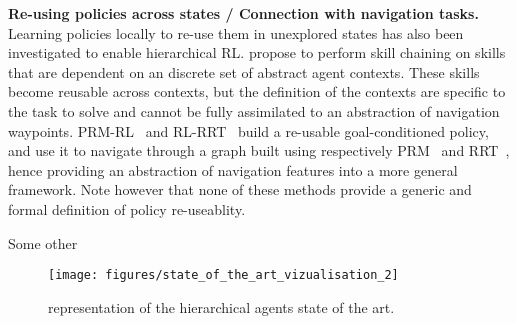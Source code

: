 \textbf{Re-using policies across states / Connection with navigation tasks.}
Learning policies locally to re-use them in unexplored states has also been investigated to enable hierarchical RL.
\citet{konidaris2007building} propose to perform skill chaining on skills that are dependent on an discrete set of
abstract agent contexts.
These skills become reusable across contexts, but the definition of the contexts are specific to the task to solve and
cannot be fully assimilated to an abstraction of navigation waypoints.
PRM-RL~\citep{faust2018prm} and RL-RRT~\citep{chiang2019rl} build a re-usable goal-conditioned policy, and use it to
navigate through a graph built using respectively PRM~\citep{kavraki1996probabilistic} and
RRT~\citep{lavalle1998rapidly}, hence providing an abstraction of navigation features into a more general framework.
Note however that none of these methods provide a generic and formal definition of policy re-useablity.

Some other 

\begin{figure}%
  \centering
  \texttt{[image: figures/state\_of\_the\_art\_vizualisation\_2]}
  \caption{representation of the hierarchical agents state of the art.}
  \label{figure:stateOfTheArt:vizualisation}
\end{figure}


